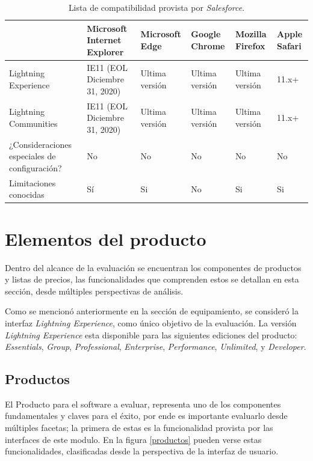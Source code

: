 \begin{table}[H]
\centering
\begin{tabular}{|p{6.0cm}|p{2.5cm}|p{1.4cm}|p{1.3cm}|p{1.3cm}|p{1.0cm}|}
\hline
& \footnotesize{\textbf{Microsoft Internet Explorer}}
& \footnotesize{\textbf{Microsoft Edge}}
& \footnotesize{\textbf{Google Chrome}}
& \footnotesize{\textbf{Mozilla Firefox}}
& \footnotesize{\textbf{Apple Safari}} \\
\hline
\footnotesize{Lightning Experience}
& \footnotesize{IE11 (EOL Diciembre 31, 2020)}
& \footnotesize{Ultima versión}
& \footnotesize{Ultima versión}
& \footnotesize{Ultima versión}
& \footnotesize{11.x+} \\
\footnotesize{Lightning Communities}
& \footnotesize{IE11 (EOL Diciembre 31, 2020)}
& \footnotesize{Ultima versión}
& \footnotesize{Ultima versión}
& \footnotesize{Ultima versión}
& \footnotesize{11.x+} \\
\footnotesize{¿Consideraciones especiales de configuración?}
& \footnotesize{No}
& \footnotesize{No}
& \footnotesize{No}
& \footnotesize{No}
& \footnotesize{No} \\
\footnotesize{Limitaciones conocidas}
& \footnotesize{Sí}
& \footnotesize{Si}
& \footnotesize{No}
& \footnotesize{Si}
& \footnotesize{Si} \\
\hline
\end{tabular}
\caption{Lista de compatibilidad provista por \emph{Salesforce}.}
\label{soporte_navegadores}
\end{table}

\section{Elementos del producto}
Dentro del alcance de la evaluación se encuentran los componentes de productos
y listas de precios, las funcionalidades que comprenden estos se detallan en
esta sección, desde múltiples perspectivas de análisis.

Como se mencionó anteriormente en la sección de equipamiento, se consideró la
interfaz \emph{Lightning Experience}, como único objetivo de la evaluación. La
versión \emph{Lightning Experience} esta disponible para las siguientes
ediciones del producto: \emph{Essentials}, \emph{Group}, \emph{Professional},
\emph{Enterprise}, \emph{Performance}, \emph{Unlimited}, y \emph{Developer}.

\subsection{Productos}
El Producto para el software a evaluar, representa uno de los componentes
fundamentales y claves para el éxito, por ende es importante evaluarlo
desde múltiples facetas; la primera de estas es la funcionalidad provista por
las interfaces de este modulo. En la figura \ref{productos} pueden verse estas
funcionalidades, clasificadas desde la perspectiva de la interfaz de usuario.

